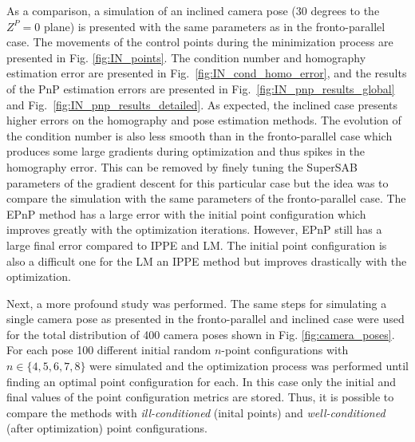 \documentclass[letterpaper, 10 pt, conference]{ieeeconf}  %
\begin{document}
	
	As a comparison, a simulation of an inclined camera pose (30 degrees to the $Z^P=0$ plane) is presented with the same parameters as in the fronto-parallel case. The movements of the control points during the minimization process are presented in Fig. \ref{fig:IN_points}. The condition number and homography estimation error are presented in Fig.~\ref{fig:IN_cond_homo_error}, and the results of the PnP estimation errors are presented in Fig.~\ref{fig:IN_pnp_results_global} and Fig.~\ref{fig:IN_pnp_results_detailed}. As expected, the inclined case presents higher errors on the homography and pose estimation methods. The evolution of the condition number is also less smooth than in the fronto-parallel case which produces some large gradients during optimization and thus spikes in the homography error. This can be removed by finely tuning the SuperSAB parameters of the gradient descent for this particular case but the idea was to compare the simulation with the same parameters of the fronto-parallel case. The EPnP method has a large error with the initial point configuration which improves greatly with the optimization iterations. However, EPnP still has a large final error compared to IPPE and LM. The initial point configuration is also a difficult one for the LM an IPPE method but improves drastically with the optimization.
	
	
	
	
	
	
	
	
	
	Next, a more profound study was performed. The same steps for simulating a single camera pose as presented in the fronto-parallel and inclined case were used for the total distribution of 400 camera poses shown in Fig. \ref{fig:camera_poses}. For each pose 100 different initial random $n$-point configurations  with $n \in \{4,5,6,7,8\}$ were simulated and the optimization process was performed until finding an optimal point configuration for each. In this case only the initial and final values of the point configuration metrics are stored. Thus, it is possible to compare the methods with 
	\textit{ill-conditioned} (inital points) and \textit{well-conditioned} (after optimization) point configurations.
	
\end{document}
